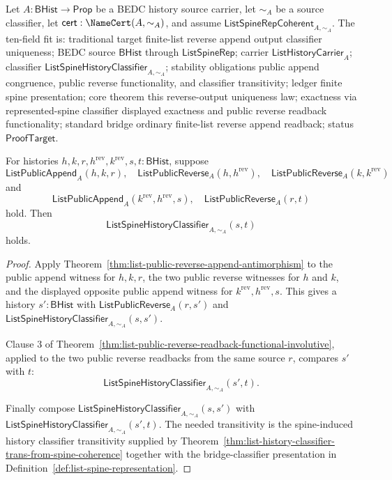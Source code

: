 \begin{theorem}
\label{thm:list-public-reverse-append-output-classifier-unique}
Let $A:\mathsf{BHist}\to\mathsf{Prop}$ be a BEDC history source carrier, let
$\sim_A$ be a source classifier, let $\mathsf{cert}:\NameCert(A,\sim_A)$, and
assume $\mathsf{ListSpineRepCoherent}_{A,\sim_A}$. The ten-field fit is:
traditional target finite-list reverse append output classifier uniqueness; BEDC
source $\mathsf{BHist}$ through $\mathsf{ListSpineRep}$; carrier
$\mathsf{ListHistoryCarrier}_A$; classifier
$\mathsf{ListSpineHistoryClassifier}_{A,\sim_A}$; stability obligations public
append congruence, public reverse functionality, and classifier transitivity;
ledger finite spine presentation; core theorem this reverse-output uniqueness
law; exactness via represented-spine classifier displayed exactness and public
reverse readback functionality; standard bridge ordinary finite-list reverse
append readback; status $\mathsf{ProofTarget}$.

For histories $h,k,r,h^{\mathrm{rev}},k^{\mathrm{rev}},s,t:\mathsf{BHist}$,
suppose
$$
\mathsf{ListPublicAppend}_A(h,k,r),
\quad
\mathsf{ListPublicReverse}_A(h,h^{\mathrm{rev}}),
\quad
\mathsf{ListPublicReverse}_A(k,k^{\mathrm{rev}})
$$
and
$$
\mathsf{ListPublicAppend}_A(k^{\mathrm{rev}},h^{\mathrm{rev}},s),
\quad
\mathsf{ListPublicReverse}_A(r,t)
$$
hold. Then
$$
\mathsf{ListSpineHistoryClassifier}_{A,\sim_A}(s,t)
$$
holds.
\end{theorem}
\begin{proof}
Apply Theorem~\ref{thm:list-public-reverse-append-antimorphism} to the public
append witness for $h,k,r$, the two public reverse witnesses for $h$ and $k$,
and the displayed opposite public append witness for
$k^{\mathrm{rev}},h^{\mathrm{rev}},s$. This gives a history
$s':\mathsf{BHist}$ with $\mathsf{ListPublicReverse}_A(r,s')$ and
$\mathsf{ListSpineHistoryClassifier}_{A,\sim_A}(s,s')$.

Clause 3 of
Theorem~\ref{thm:list-public-reverse-readback-functional-involutive}, applied to
the two public reverse readbacks from the same source $r$, compares $s'$ with
$t$:
$$
\mathsf{ListSpineHistoryClassifier}_{A,\sim_A}(s',t).
$$

Finally compose
$\mathsf{ListSpineHistoryClassifier}_{A,\sim_A}(s,s')$ with
$\mathsf{ListSpineHistoryClassifier}_{A,\sim_A}(s',t)$. The needed transitivity
is the spine-induced history classifier transitivity supplied by
Theorem~\ref{thm:list-history-classifier-trans-from-spine-coherence} together
with the bridge-classifier presentation in
Definition~\ref{def:list-spine-representation}.
\end{proof}

